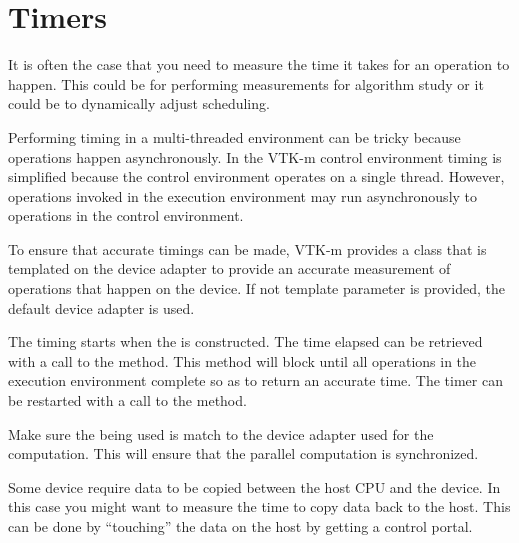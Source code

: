
\chapter{Timers}
\label{chap:Timers}
\label{chap:Timer}


It is often the case that you need to measure the time it takes for an
operation to happen. This could be for performing measurements for
algorithm study or it could be to dynamically adjust scheduling.

Performing timing in a multi-threaded environment can be tricky because
operations happen asynchronously. In the VTK-m control environment timing
is simplified because the control environment operates on a single
thread. However, operations invoked in the execution environment may run
asynchronously to operations in the control environment.

To ensure that accurate timings can be made, VTK-m provides a
 class that is templated on the device adapter to provide
an accurate measurement of operations that happen on the device. If not
template parameter is provided, the default device adapter is used.

The timing starts when the  is constructed. The time
elapsed can be retrieved with a call to the 
method. This method will block until all operations in the execution
environment complete so as to return an accurate time. The timer can be
restarted with a call to the  method.


\begin{commonerrors}
  Make sure the  being used is match to the device
  adapter used for the computation. This will ensure that the parallel
  computation is synchronized.
\end{commonerrors}

\begin{commonerrors}
  Some device require data to be copied between the host CPU and the
  device. In this case you might want to measure the time to copy data back
  to the host. This can be done by ``touching'' the data on the host by
  getting a control portal.
\end{commonerrors}

